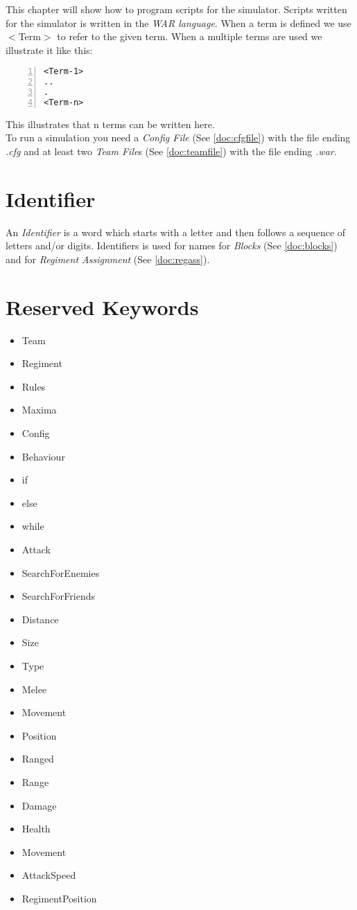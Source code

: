 This chapter will show how to program scripts for the simulator. Scripts written for the simulator is written in the {\it WAR language}. 
When a term is defined we use $<$Term$>$ to refer to the given term. 
When a multiple terms are used we illustrate it like this: \\

\begin{lstlisting}[basicstyle=\small\sffamily,
keywordstyle={\color{blue}},
comment={[l]{//}}, morecomment={[s]{/*}{*/}}, commentstyle=\itshape,
columns={[l]flexible}, numbers=left, numberstyle=\tiny,
frameround=fftt, frame=shadowbox, captionpos=b,
caption={Scripting}]
<Term-1>
..
.
<Term-n>
\end{lstlisting}
This illustrates that n terms can be written here. \\

To run a simulation you need a {\it Config File} (See \ref{doc:cfgfile}) with the file ending {\it .cfg} and at least two {\it Team File}s 
(See \ref{doc:teamfile}) with the file ending {\it .war}.

\section{Identifier}
	An {\it Identifier} is a word which starts with a letter and then follows a sequence of letters and/or digits.
	Identifiers is used for names for {\it Blocks} (See \ref{doc:blocks}) and for {\it Regiment Assignment} (See \ref{doc:regass}).
\section{Reserved Keywords}
	\begin{itemize}
		\item Team
		\item Regiment
		\item Rules
		\item Maxima
		\item Config
		\item Behaviour
		\item if
		\item else
		\item while
		\item Attack
		\item SearchForEnemies
		\item SearchForFriends
		\item Distance
		\item Size
		\item Type 
		\item Melee
		\item Movement
		\item Position
		\item Ranged
		\item Range
		\item Damage
		\item Health
		\item Movement
		\item AttackSpeed
		\item RegimentPosition
	\end{itemize}

